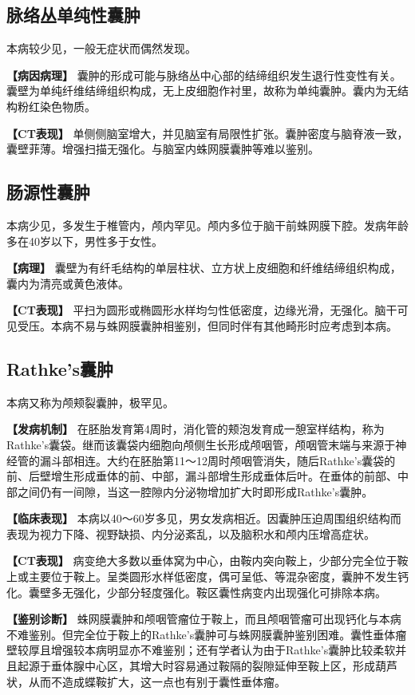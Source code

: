 \subsection{脉络丛单纯性囊肿}

本病较少见，一般无症状而偶然发现。

\textbf{【病因病理】}
囊肿的形成可能与脉络丛中心部的结缔组织发生退行性变性有关。囊壁为单纯纤维结缔组织构成，无上皮细胞作衬里，故称为单纯囊肿。囊内为无结构粉红染色物质。

\textbf{【CT表现】}
单侧侧脑室增大，并见脑室有局限性扩张。囊肿密度与脑脊液一致，囊壁菲薄。增强扫描无强化。与脑室内蛛网膜囊肿等难以鉴别。

\subsection{肠源性囊肿}

本病少见，多发生于椎管内，颅内罕见。颅内多位于脑干前蛛网膜下腔。发病年龄多在40岁以下，男性多于女性。

\textbf{【病理】}
囊壁为有纤毛结构的单层柱状、立方状上皮细胞和纤维结缔组织构成，囊内为清亮或黄色液体。

\textbf{【CT表现】}
平扫为圆形或椭圆形水样均匀性低密度，边缘光滑，无强化。脑干可见受压。本病不易与蛛网膜囊肿相鉴别，但同时伴有其他畸形时应考虑到本病。

\subsection{Rathke's囊肿}

本病又称为颅颊裂囊肿，极罕见。

\textbf{【发病机制】}
在胚胎发育第4周时，消化管的颊泡发育成一憩室样结构，称为Rathke's囊袋。继而该囊袋内细胞向颅侧生长形成颅咽管，颅咽管末端与来源于神经管的漏斗部相连。大约在胚胎第11～12周时颅咽管消失，随后Rathke's囊袋的前、后壁增生形成垂体的前、中部，漏斗部增生形成垂体后叶。在垂体的前部、中部之间仍有一间隙，当这一腔隙内分泌物增加扩大时即形成Rathke's囊肿。

\textbf{【临床表现】}
本病以40～60岁多见，男女发病相近。因囊肿压迫周围组织结构而表现为视力下降、视野缺损、内分泌紊乱，以及脑积水和颅内压增高症状。

\textbf{【CT表现】}
病变绝大多数以垂体窝为中心，由鞍内突向鞍上，少部分完全位于鞍上或主要位于鞍上。呈类圆形水样低密度，偶可呈低、等混杂密度，囊肿不发生钙化。囊壁多无强化，少部分轻度强化。鞍区囊性病变内出现强化可排除本病。

\textbf{【鉴别诊断】}
蛛网膜囊肿和颅咽管瘤位于鞍上，而且颅咽管瘤可出现钙化与本病不难鉴别。但完全位于鞍上的Rathke's囊肿可与蛛网膜囊肿鉴别困难。囊性垂体瘤壁较厚且增强较本病明显亦不难鉴别；还有学者认为由于Rathke's囊肿比较柔软并且起源于垂体腺中心区，其增大时容易通过鞍隔的裂隙延伸至鞍上区，形成葫芦状，从而不造成蝶鞍扩大，这一点也有别于囊性垂体瘤。

